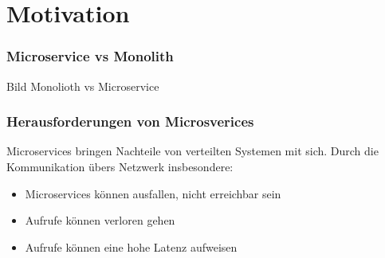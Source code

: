 \section{Motivation}

\begin{frame}
    \frametitle{Microservice vs Monolith}

    Bild Monolioth vs Microservice
    
\end{frame}

\begin{frame}
    \frametitle{Herausforderungen von Microsverices}

    Microservices bringen Nachteile von verteilten Systemen mit sich. Durch die Kommunikation übers Netzwerk insbesondere:

    \begin{itemize}
        
        \item Microservices können ausfallen, nicht erreichbar sein
        \item Aufrufe können verloren gehen
        \item Aufrufe können eine hohe Latenz aufweisen
    \end{itemize}
\end{frame}

